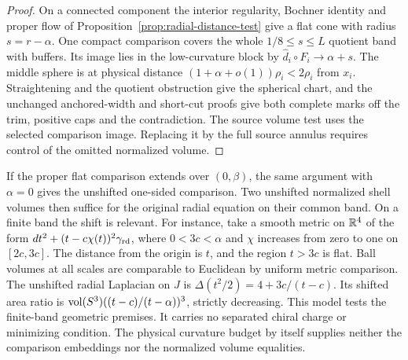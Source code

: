 \begin{proof}
On a connected component the interior regularity, Bochner
identity and proper flow of
Proposition~\ref{prop:radial-distance-test} give a flat cone
with radius \(s=r-\alpha\). One compact comparison covers
the whole \(1/8\le s\le L\) quotient band with buffers.
Its image lies in the low-curvature block by
\(\widehat d_i\circ F_i\to\alpha+s\). The middle sphere is
at physical distance \((1+\alpha+o(1))\rho_i<2\rho_i\)
from \(x_i\). Straightening and the quotient obstruction
give the spherical chart, and the unchanged anchored-width
and short-cut proofs give both complete marks off the trim,
positive caps and the contradiction. The source volume
test uses the selected comparison image. Replacing it by
the full source annulus requires control of the omitted
normalized volume.
\end{proof}

If the proper flat comparison extends over \((0,\beta)\),
the same argument with \(\alpha=0\) gives the unshifted
one-sided comparison. Two unshifted normalized shell
volumes then suffice for the original radial equation on
their common band. On a finite band the shift is relevant.
For instance, take a smooth metric on \(\mathbb R^4\) of the form
\(dt^2+(t-c\chi(t))^2\gamma_{\rm rd}\), where
\(0<3c<\alpha\) and \(\chi\) increases from zero to one
on \([2c,3c]\). The distance from the origin is \(t\),
and the region \(t>3c\) is flat. Ball volumes at all
scales are comparable to Euclidean by uniform metric
comparison. The unshifted radial Laplacian on \(J\) is
\(\Delta(t^2/2)=4+3c/(t-c)\). Its shifted area ratio is
\(\operatorname{vol}(S^3)((t-c)/(t-\alpha))^3\), strictly decreasing.
This model tests the finite-band geometric premises.
It carries no separated chiral charge or minimizing
condition. The physical curvature budget by itself
supplies neither the comparison embeddings nor the
normalized volume equalities.
